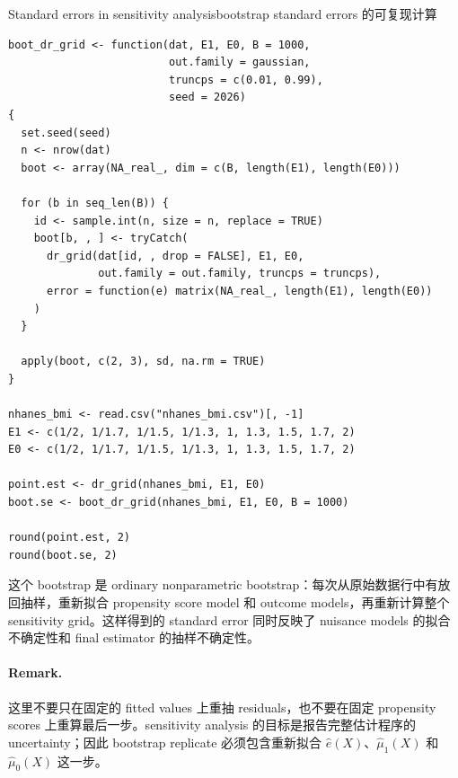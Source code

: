 \begin{exercisesolution}{Standard errors in sensitivity analysis}{bootstrap standard errors 的可复现计算}
\begin{lstlisting}
boot_dr_grid <- function(dat, E1, E0, B = 1000,
                         out.family = gaussian,
                         truncps = c(0.01, 0.99),
                         seed = 2026)
{
  set.seed(seed)
  n <- nrow(dat)
  boot <- array(NA_real_, dim = c(B, length(E1), length(E0)))

  for (b in seq_len(B)) {
    id <- sample.int(n, size = n, replace = TRUE)
    boot[b, , ] <- tryCatch(
      dr_grid(dat[id, , drop = FALSE], E1, E0,
              out.family = out.family, truncps = truncps),
      error = function(e) matrix(NA_real_, length(E1), length(E0))
    )
  }

  apply(boot, c(2, 3), sd, na.rm = TRUE)
}

nhanes_bmi <- read.csv("nhanes_bmi.csv")[, -1]
E1 <- c(1/2, 1/1.7, 1/1.5, 1/1.3, 1, 1.3, 1.5, 1.7, 2)
E0 <- c(1/2, 1/1.7, 1/1.5, 1/1.3, 1, 1.3, 1.5, 1.7, 2)

point.est <- dr_grid(nhanes_bmi, E1, E0)
boot.se <- boot_dr_grid(nhanes_bmi, E1, E0, B = 1000)

round(point.est, 2)
round(boot.se, 2)
\end{lstlisting}

这个 bootstrap 是 ordinary nonparametric bootstrap：每次从原始数据行中有放回抽样，重新拟合 propensity score model 和 outcome models，再重新计算整个 sensitivity grid。这样得到的 standard error 同时反映了 nuisance models 的拟合不确定性和 final estimator 的抽样不确定性。

\paragraph{Remark.}
这里不要只在固定的 fitted values 上重抽 residuals，也不要在固定 propensity scores 上重算最后一步。sensitivity analysis 的目标是报告完整估计程序的 uncertainty；因此 bootstrap replicate 必须包含重新拟合 $\hat e(X)$、$\hat\mu_1(X)$ 和 $\hat\mu_0(X)$ 这一步。
\end{exercisesolution}

